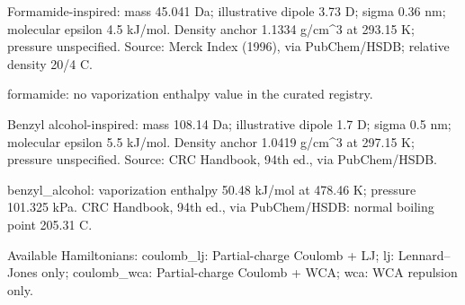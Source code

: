 \documentclass[11pt]{article}
\begin{document}
Formamide-inspired: mass 45.041 Da; illustrative dipole 3.73 D; sigma 0.36 nm; molecular epsilon 4.5 kJ/mol. Density anchor 1.1334 g/cm\textasciicircum{}3 at 293.15 K; pressure unspecified. Source: Merck Index (1996), via PubChem/HSDB; relative density 20/4 C.


formamide: no vaporization enthalpy value in the curated registry.


Benzyl alcohol-inspired: mass 108.14 Da; illustrative dipole 1.7 D; sigma 0.5 nm; molecular epsilon 5.5 kJ/mol. Density anchor 1.0419 g/cm\textasciicircum{}3 at 297.15 K; pressure unspecified. Source: CRC Handbook, 94th ed., via PubChem/HSDB.


benzyl\_alcohol: vaporization enthalpy 50.48 kJ/mol at 478.46 K; pressure 101.325 kPa. CRC Handbook, 94th ed., via PubChem/HSDB: normal boiling point 205.31 C.


Available Hamiltonians: coulomb\_lj: Partial-charge Coulomb + LJ; lj: Lennard–Jones only; coulomb\_wca: Partial-charge Coulomb + WCA; wca: WCA repulsion only.
\end{document}
